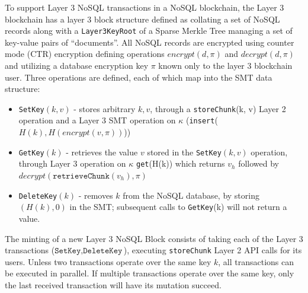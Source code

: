\documentclass{article}
\newcommand{\databaseencryptionkey}{\pi}
\newcommand{\keyroot}{\kappa}
\newcommand{\hash}[1]{H(#1)}
\newcommand{\encrypt}[1]{encrypt(#1, \databaseencryptionkey)}
\newcommand{\decrypt}[1]{decrypt(#1, \databaseencryptionkey)}
\newcommand{\emptyhash}{0}
\begin{document}
To support Layer 3 NoSQL transactions in a NoSQL blockchain, the Layer 3 blockchain has a layer 3 block structure defined as collating a set of NoSQL records along with a {\tt Layer3KeyRoot} of a Sparse Merkle Tree managing a set of key-value pairs of ``documents''.  All NoSQL records are encrypted using counter mode (CTR) encryption defining operations $\encrypt{d}$ and $\decrypt{d}$ and utilizing a database encryption key $\databaseencryptionkey$ known only to the layer 3 blockchain user.   Three operations are defined, each of which map into the SMT data structure:
\begin{itemize}
\item \texttt{SetKey}$(k,v)$ - stores arbitrary $k,v$, through a \texttt{storeChunk}(k, v) Layer 2 operation and a Layer 3 SMT operation on $\keyroot$ (\texttt{insert}($\hash{k},\hash{\encrypt{v}}$))
\item \texttt{GetKey}$(k)$ - retrieves the value $v$ stored in the {\tt SetKey}$(k,v)$ operation, through Layer 3 operation on $\keyroot$ \texttt{get}(\hash{k}) which returns $v_h$ followed by $\decrypt{\texttt{retrieveChunk}(v_h)}$
\item \texttt{DeleteKey}$(k)$ - removes $k$ from the NoSQL database, by storing $(\hash{k},\emptyhash)$ in the SMT; subsequent calls to \texttt{GetKey}(k) will not return a value.
\end{itemize}
The minting of a new Layer 3 NoSQL Block consists of taking each of the Layer 3 transactions ($\texttt{SetKey}, \texttt{DeleteKey}$), executing  \texttt{storeChunk} Layer 2 API calls for its users.  Unless two transactions operate over the same key $k$, all transactions can be executed in parallel.  If multiple transactions operate over the same key, only the last received transaction will have its mutation succeed.
\end{document}
